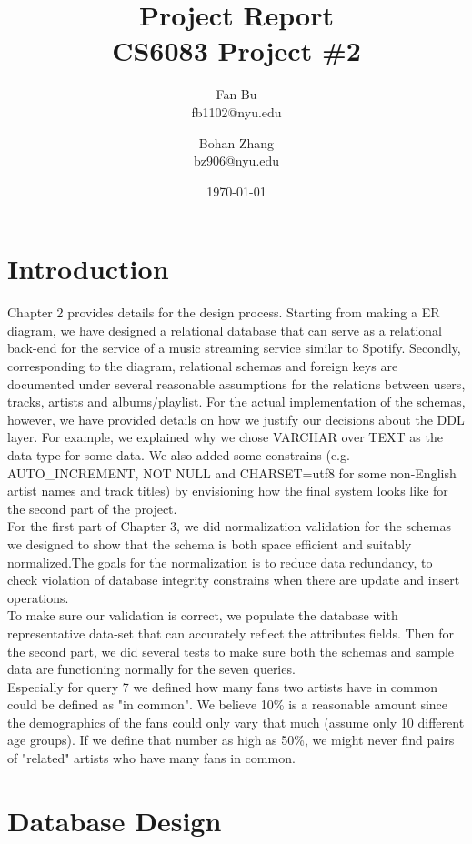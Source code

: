 \documentclass[letterpaper, 12pt]{report}
\title{
	{Project Report}\\
	{\large CS6083 Project \#2}}
\author{Fan Bu \\ fb1102@nyu.edu \and Bohan Zhang \\ bz906@nyu.edu}
\date{\today}
\begin{document}
	\maketitle
	
	\tableofcontents
	
	\chapter{Introduction}
	
	Chapter 2 provides details for the design process. Starting from making a ER diagram, we have designed a relational database that can serve as a relational back-end for the service of a music streaming service similar to Spotify. Secondly, corresponding to the diagram, relational schemas and foreign keys are documented under several reasonable assumptions for the relations between users, tracks, artists and albums/playlist. For the actual implementation of the schemas, however, we have provided details on how we justify our decisions about the DDL layer. For example, we explained why we chose VARCHAR over TEXT as the data type for some data. We also added some constrains (e.g. AUTO\_INCREMENT, NOT NULL and CHARSET=utf8 for some non-English artist names and track titles) by envisioning how the final system looks like for the second part of the project.\\   
	For the first part of Chapter 3, we did normalization validation for the schemas we designed to show that the schema is both space efficient and suitably normalized.The goals for the normalization is to reduce data redundancy, to check violation of database integrity constrains when there are update and insert operations.\\
	To make sure our validation is correct, we populate the database with representative data-set that can accurately reflect the attributes fields.
    Then for the second part, we did several tests to make sure both the schemas and sample data are functioning normally for the seven queries.\\ 
    Especially for query 7 we defined how many fans two artists have in common could be defined as "in common". We believe 10\% is a reasonable amount since the demographics of the fans could only vary that much (assume only 10 different age groups). If we define that number as high as 50\%, we might never find pairs of "related" artists who have many fans in common. 
	
	
	\chapter{Database Design}
\end{document}
